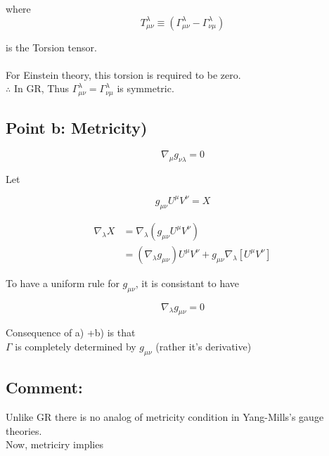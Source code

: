 \documentclass[12pt, letterpaper]{article}
\newcommand*{\1}{\hspace{1pt}}
\begin{document}
        where 
        \begin{equation}
            T ^{\lambda} _{\mu \nu} \equiv \left(\Gamma ^{\lambda} _{\mu \nu} - \Gamma ^{\lambda} _{\nu \mu}\right)
        \end{equation}

        is the Torsion tensor.\\    
        \\
        For Einstein theory, this torsion is required to be zero.\\
        $\therefore$ In GR, Thus $\Gamma^{\lambda}_{\mu \nu} = \Gamma^{\lambda}_{\nu \mu}$ is symmetric.

    \subsection*{Point b: Metricity)}

        \begin{equation}
            \nabla _{\mu} g_{\nu \lambda} = 0 \tag*{(Why?)}
        \end{equation}

        Let 

        \begin{equation}
            g_{\mu \nu} U^{\mu} V^{\nu} = X
        \end{equation}

        \begin{equation}
            \begin{split}
                \nabla _{\lambda} X & = \nabla _{\lambda}(g_{\mu \nu} U^{\mu} V^{\nu}) \\ 
                 & = (\nabla _{\lambda}g_{\mu \nu}) U^{\mu} V^{\nu} + g_{\mu \nu}\nabla_{\lambda}[U^{\mu}V^{\nu}]
            \end{split}
        \end{equation}

        To have a uniform rule for $g_{\mu \nu}$, it is consistant to have 

        \begin{equation}
            \nabla _{\lambda}g_{\mu \nu} = 0
        \end{equation}

        Consequence of a) +b) is that \\
        $\Gamma$ is completely determined by $g_{\mu \nu}$ (rather it's derivative)

        \subsection*{Comment:}
        Unlike GR there is no analog of metricity condition in Yang-Mills's gauge theories.\\
        Now, metriciry implies 
\end{document}
